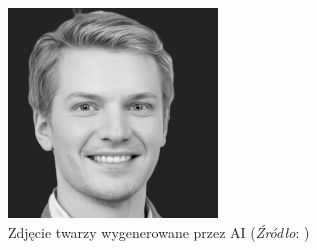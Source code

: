 \begin{figure}[!htb]
    \centering
    \begin{subfigure}[b]{0.3\textwidth}
        \centering
        \label{fig:complexity_ai}
         \includegraphics[width=\textwidth]{images/complexity/originals/ai2.png}
         \caption{Zdjęcie twarzy wygenerowane przez AI (\textit{Źródło}: \cite{AIFace})}
    \end{subfigure}
    \begin{subfigure}[b]{0.3\textwidth}
        \centering
        \label{fig:complexity_mona}

\end{subfigure}
\end{figure}
